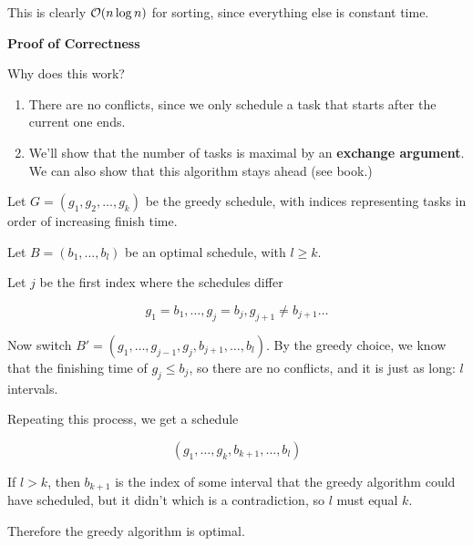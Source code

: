 \documentclass[12pt]{article}
\begin{document}
  This is clearly $\mathcal O(n \log n)$ for sorting, since everything else is constant
  time.



  {\bf Proof of Correctness}

  Why does this work?

  \begin{enumerate}
    \item There are no conflicts, since we only schedule a task that starts after
      the current one ends.

    \item We'll show that the number of tasks is maximal by an {\bf exchange
      argument}. We can also show that this algorithm stays ahead (see book.)
  \end{enumerate}

  {
    Let $G = (g_1, g_2, ..., g_k)$ be the greedy schedule, with indices
    representing tasks in order of increasing finish time.

    Let $B = (b_1, ..., b_l)$ be an optimal schedule, with $l \ge k$.


    Let $j$ be the first index where the schedules differ

    \[
      g_1 = b_1, \dots, g_j = b_j, g_{j + 1} \ne b_{j + 1} \dots
    \]

    Now switch $B' = (g_1, \dots, g_{j - 1}, g_j, b_{j + 1}, \dots, b_l)$. By the
    greedy choice, we know that the finishing time of $g_j \le b_j$, so there are
    no conflicts, and it is just as long: $l$ intervals.


    Repeating this process, we get a schedule

    \[
      (g_1, \dots, g_k, b_{k + 1}, \dots, b_l)
    \]

    If $l > k$, then $b_{k + 1}$ is the index of some interval that the greedy
    algorithm could have scheduled, but it didn't which is a contradiction, so $l$
    must equal $k$.

    Therefore the greedy algorithm is optimal.
  }

\end{document}
